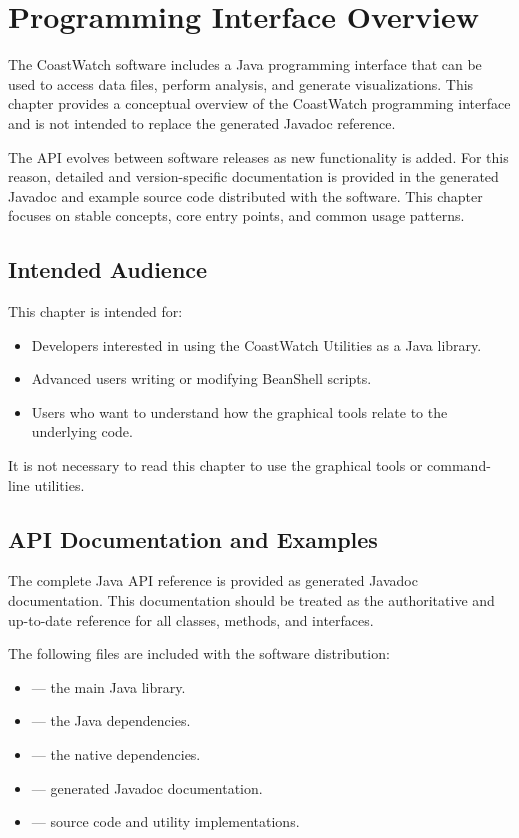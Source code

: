 \chapter{Programming Interface Overview}
\label{api}

The CoastWatch software includes a Java programming interface that can be
used to access data files, perform analysis, and generate visualizations.
This chapter provides a conceptual overview of the CoastWatch
programming interface and is not intended to replace the generated
Javadoc reference.

The API evolves between software releases as new functionality is added.
For this reason, detailed and version-specific documentation is provided
in the generated Javadoc and example source code distributed with the
software. This chapter focuses on stable concepts, core entry points,
and common usage patterns.

\section{Intended Audience}

This chapter is intended for:
\begin{itemize}
  \item Developers interested in using the CoastWatch Utilities as a Java
        library.
  \item Advanced users writing or modifying BeanShell scripts.
  \item Users who want to understand how the graphical tools relate to
        the underlying code.
\end{itemize}

It is not necessary to read this chapter to use the graphical tools or
command-line utilities.

\section{API Documentation and Examples}

The complete Java API reference is provided as generated Javadoc
documentation. This documentation should be treated as the authoritative
and up-to-date reference for all classes, methods, and interfaces.

The following files are included with the software distribution:
\begin{itemize}
  \item {} --- the main Java library.
  \item {} --- the Java dependencies.
  \item {} --- the native dependencies.
  \item {} --- generated Javadoc documentation.
  \item {} --- source code and utility implementations.
\end{itemize}


